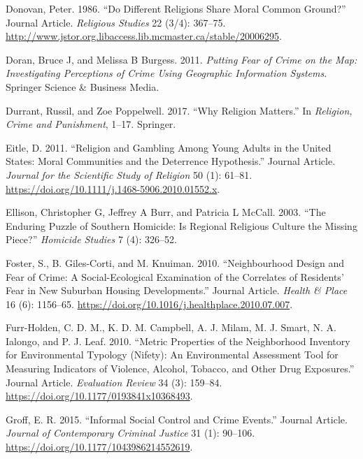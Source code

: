 \documentclass[smallextended]{svjour3}       %
\begin{document}
\leavevmode\hypertarget{ref-Donovan1986different}{}%
Donovan, Peter. 1986. ``Do Different Religions Share Moral Common
Ground?'' Journal Article. \emph{Religious Studies} 22 (3/4): 367--75.
\url{http://www.jstor.org.libaccess.lib.mcmaster.ca/stable/20006295}.

\leavevmode\hypertarget{ref-Doran2011putting}{}%
Doran, Bruce J, and Melissa B Burgess. 2011. \emph{Putting Fear of Crime
on the Map: Investigating Perceptions of Crime Using Geographic
Information Systems}. Springer Science \& Business Media.

\leavevmode\hypertarget{ref-Durrant2017religion}{}%
Durrant, Russil, and Zoe Poppelwell. 2017. ``Why Religion Matters.'' In
\emph{Religion, Crime and Punishment}, 1--17. Springer.

\leavevmode\hypertarget{ref-Eitle2011religion}{}%
Eitle, D. 2011. ``Religion and Gambling Among Young Adults in the United
States: Moral Communities and the Deterrence Hypothesis.'' Journal
Article. \emph{Journal for the Scientific Study of Religion} 50 (1):
61--81. \url{https://doi.org/10.1111/j.1468-5906.2010.01552.x}.

\leavevmode\hypertarget{ref-Ellison2003enduring}{}%
Ellison, Christopher G, Jeffrey A Burr, and Patricia L McCall. 2003.
``The Enduring Puzzle of Southern Homicide: Is Regional Religious
Culture the Missing Piece?'' \emph{Homicide Studies} 7 (4): 326--52.

\leavevmode\hypertarget{ref-Foster2010neighbourhood}{}%
Foster, S., B. Giles-Corti, and M. Knuiman. 2010. ``Neighbourhood Design
and Fear of Crime: A Social-Ecological Examination of the Correlates of
Residents' Fear in New Suburban Housing Developments.'' Journal Article.
\emph{Health \& Place} 16 (6): 1156--65.
\url{https://doi.org/10.1016/j.healthplace.2010.07.007}.

\leavevmode\hypertarget{ref-Furr2010metric}{}%
Furr-Holden, C. D. M., K. D. M. Campbell, A. J. Milam, M. J. Smart, N.
A. Ialongo, and P. J. Leaf. 2010. ``Metric Properties of the
Neighborhood Inventory for Environmental Typology (Nifety): An
Environmental Assessment Tool for Measuring Indicators of Violence,
Alcohol, Tobacco, and Other Drug Exposures.'' Journal Article.
\emph{Evaluation Review} 34 (3): 159--84.
\url{https://doi.org/10.1177/0193841x10368493}.

\leavevmode\hypertarget{ref-Groff2015informal}{}%
Groff, E. R. 2015. ``Informal Social Control and Crime Events.'' Journal
Article. \emph{Journal of Contemporary Criminal Justice} 31 (1):
90--106. \url{https://doi.org/10.1177/1043986214552619}.
\end{document}
